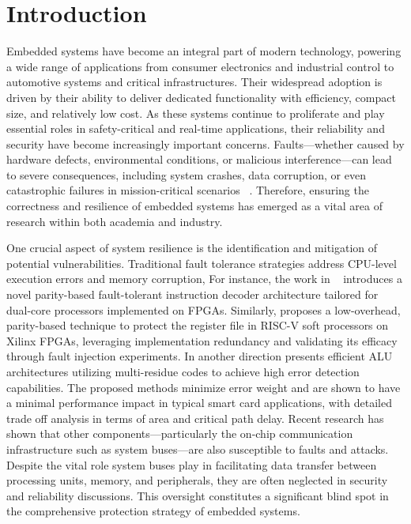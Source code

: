 \chapter*{Introduction}

Embedded systems have become an integral part of modern technology, powering a wide range of applications from consumer electronics and industrial control to automotive systems and critical infrastructures. Their widespread adoption is driven by their ability to deliver dedicated functionality with efficiency, compact size, and relatively low cost. As these systems continue to proliferate and play essential roles in safety-critical and real-time applications, their reliability and security have become increasingly important concerns. Faults—whether caused by hardware defects, environmental conditions, or malicious interference—can lead to severe consequences, including system crashes, data corruption, or even catastrophic failures in mission-critical scenarios~\cite{bar2006sorcerer} \cite{karaklajic2013hardware}. Therefore, ensuring the correctness and resilience of embedded systems has emerged as a vital area of research within both academia and industry.

One crucial aspect of system resilience is the identification and mitigation of potential vulnerabilities. Traditional fault tolerance strategies address CPU-level execution errors and memory corruption,  For instance, the work in ~\cite{Shukla2023An} introduces a novel parity-based fault-tolerant instruction decoder architecture tailored for dual-core processors implemented on FPGAs. Similarly,\cite{Ramos2018Efficient} proposes a low-overhead, parity-based technique to protect the register file in RISC-V soft processors on Xilinx FPGAs, leveraging implementation redundancy and validating its efficacy through fault injection experiments. In another direction \cite{Medwed2011Arithmetic} presents efficient ALU architectures utilizing multi-residue codes to achieve high error detection capabilities. The proposed methods minimize error weight and are shown to have a minimal performance impact in typical smart card applications, with detailed trade off analysis in terms of area and critical path delay. Recent research has shown that other components—particularly the on-chip communication infrastructure such as system buses—are also susceptible to faults and attacks. Despite the vital role system buses play in facilitating data transfer between processing units, memory, and peripherals, they are often neglected in security and reliability discussions. This oversight constitutes a significant blind spot in the comprehensive protection strategy of embedded systems.

